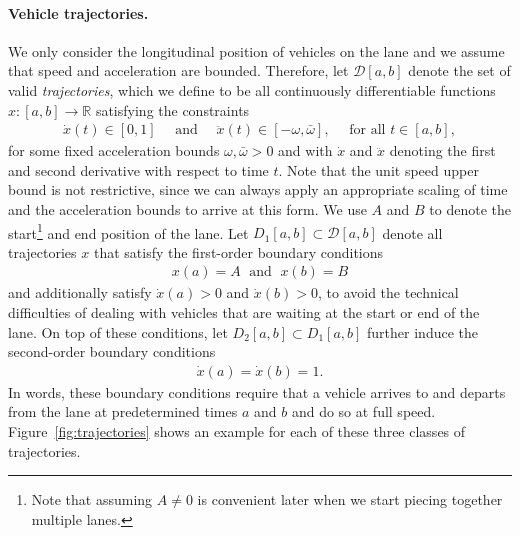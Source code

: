 \documentclass[a4paper]{report}
\theoremstyle{definition}
\theoremstyle{plain}
\begin{document}
\paragraph{Vehicle trajectories.}
We only consider the longitudinal position of vehicles on the lane and we assume
that speed and acceleration are bounded. Therefore, let $\mathcal{D}[a,b]$
denote the set of valid \emph{trajectories}, which we define to be all continuously
differentiable functions $x : [a,b] \rightarrow \mathbb{R}$ satisfying the constraints
\begin{align}
  \dot{x}(t) \in [0, 1] \quad \text{ and } \quad
  \ddot{x}(t) \in [{-\omega} ,\bar{\omega}] , \quad \text{ for all } t \in [a,b] ,
\end{align}
for some fixed acceleration bounds $\omega, \bar{\omega} > 0$ and with $\dot{x}$ and
$\ddot{x}$ denoting the first and second derivative with respect to time $t$.
Note that the unit speed upper bound is not restrictive, since we can always
apply an appropriate scaling of time and the acceleration bounds to arrive at
this form.
%
We use $A$ and $B$ to denote the start\footnote{Note that assuming $A\neq 0$ is convenient later when we start piecing together multiple lanes.} and end position of the lane.
%
Let $D_{1}[a, b] \subset \mathcal{D}[a, b]$ denote all trajectories $x$ that satisfy
the first-order boundary conditions
\begin{align}
  x(a) = A \; \text{ and } \; x(b) = B
\end{align}
and additionally satisfy $\dot{x}(a) > 0$ and $\dot{x}(b) > 0$, to avoid the
technical difficulties of dealing with vehicles that are waiting at the start or
end of the lane.
%
On top of these conditions, let $D_{2}[a,b] \subset D_{1}[a, b]$ further induce the
second-order boundary conditions
\begin{align}
  \dot{x}(a) = \dot{x}(b) = 1 .
\end{align}
In words, these boundary conditions require that a vehicle arrives to and
departs from the lane at predetermined times $a$ and $b$ and do so at full
speed.
%
Figure~\ref{fig:trajectories} shows an example for each of these three classes of trajectories.
\end{document}
